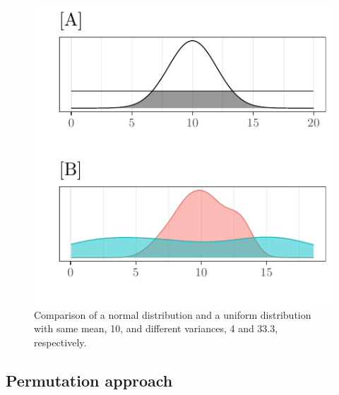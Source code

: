 \documentclass[twocolumn]{article}\usepackage[]{graphicx}\usepackage[]{xcolor}
\makeatletter
\def\maxwidth{ %
  \ifdim\Gin@nat@width>\linewidth
    \linewidth
  \else
    \Gin@nat@width
  \fi
}
\newenvironment{knitrout}{}{} %
\makeatother
\begin{document}
\begin{knitrout}
\color{fgcolor}\begin{figure}

{\centering \includegraphics[width=\maxwidth]{figure/equalmeans-1} 

}

\caption[Comparison of a normal distribution and a uniform distribution with same mean, 10, and different variances, 4 and 33.3, respectively]{Comparison of a normal distribution and a uniform distribution with same mean, 10, and different variances, 4 and 33.3, respectively.}\label{fig:equalmeans}
\end{figure}

\end{knitrout}





\subsection{Permutation approach}
\end{document}

